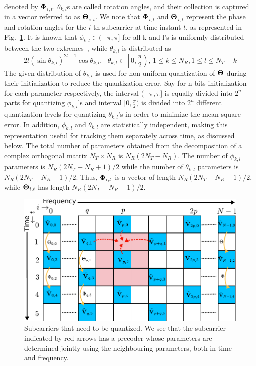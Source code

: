 \documentclass[journal,10pt,twocolumn]{IEEEtran}
\begin{document}
denoted by $\bf{\Phi}$$_{i,t}$. $\theta_{k,l}$s are called rotation angles, and
their collection is captured in a vector referred to as
$\bf{\Theta}$$_{i,t}$. We note that $\bf{\Phi}$$_{i,t}$ and $\bf{\Theta}$$_{i,t}$ represent
the phase and rotation angles for the $i$-th subcarrier at time
instant $t$, as represented in Fig.~\ref{fig:adpm-fig}. It is known
that $\phi_{k,l} \in (-\pi, \pi]$ for all k and l's is uniformly distributed 
between the two
extremes~\cite{4114278}, while $\theta_{k,l}$ is distributed
as~\cite{4114278}
\begin{equation}
2l(\sin\theta_{k,l})^{2l-1}\cos\theta_{k,l}, \mbox{  }\theta_{k,l} \in \left[0, \frac{\pi}{2}\right) \mbox{, }1\leq k \leq N_R, 1\leq l 
\leq N_T -k
\end{equation}
The given distribution of $\theta_{k,l}$ is used for non-uniform quantization
of $\bf{\Theta}$ during their initialization to reduce the quantization error.
Say for n bits initialization for each parameter respectively, the interval $(-\pi,\pi]$ 
is equally divided into $2^n$ parts for quantizing $\phi_{k,l}$'s and interval $[0,\frac{\pi}{2})$
is divided into $2^n$ different quantization levels for quantizing $\theta_{k,l}$'s in order to minimize
the mean square error.
In addition, $\phi_{k,l}$ and $\theta_{k,l}$ are statistically independent,
making this representation useful for tracking them separately across
time, as discussed below. The total number of
parameters obtained from the decomposition of a complex orthogonal
matrix $N_{T} \times N_{R} $ is $N_{R}(2N_{T} - N_{R})$. The number of
$\phi_{k,l}$ parameters is $N_{R}(2N_{T} - N_{R}+1)/2$ while the number of
$\theta_{k,l}$ parameters is $N_{R}(2N_{T} - N_{R}-1)/2$. Thus, ${\bf{\Phi}}_{i,t}$
is a vector of length $N_{R}(2N_{T} - N_{R}+1)/2$, while
${\bf{\Theta}}_{i,t}$ has length $N_{R}(2N_{T} - N_{R}-1)/2$.~\cite{4114278}
\begin{figure}
\begin{center}
\includegraphics[width=0.7\columnwidth]{images/new-adpm.pdf}
\caption{\label{fig:adpm-fig}Subcarriers that need to be
  quantized. We see that the subcarrier indicated by
  red arrows has a precoder whose parameters are determined jointly
  using the neighbouring parameters, both in time and frequency.}
\end{center}
\end{figure}
\end{document}
